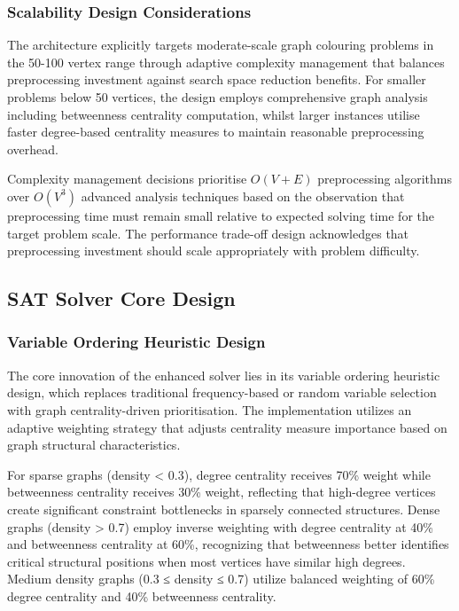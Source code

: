 \subsubsection{Scalability Design Considerations}

The architecture explicitly targets moderate-scale graph colouring problems in the 50-100 vertex range through adaptive complexity management that balances preprocessing investment against search space reduction benefits. For smaller problems below 50 vertices, the design employs comprehensive graph analysis including betweenness centrality computation, whilst larger instances utilise faster degree-based centrality measures to maintain reasonable preprocessing overhead.

Complexity management decisions prioritise $O(V+E)$ preprocessing algorithms over $O(V^3)$ advanced analysis techniques based on the observation that preprocessing time must remain small relative to expected solving time for the target problem scale. The performance trade-off design acknowledges that preprocessing investment should scale appropriately with problem difficulty.

\subsection{SAT Solver Core Design}

\subsubsection{Variable Ordering Heuristic Design}

The core innovation of the enhanced solver lies in its variable ordering heuristic design, which replaces traditional frequency-based or random variable selection with graph centrality-driven prioritisation. The implementation utilizes an adaptive weighting strategy that adjusts centrality measure importance based on graph structural characteristics.

For sparse graphs (density < 0.3), degree centrality receives 70\% weight while betweenness centrality receives 30\% weight, reflecting that high-degree vertices create significant constraint bottlenecks in sparsely connected structures. Dense graphs (density > 0.7) employ inverse weighting with degree centrality at 40\% and betweenness centrality at 60\%, recognizing that betweenness better identifies critical structural positions when most vertices have similar high degrees. Medium density graphs (0.3 ≤ density ≤ 0.7) utilize balanced weighting of 60\% degree centrality and 40\% betweenness centrality.

